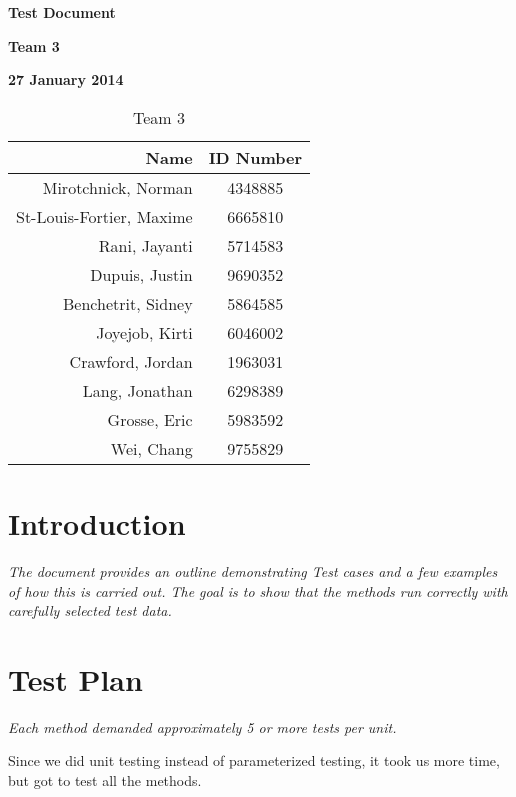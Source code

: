 \documentclass[12pt]{article}
\begin{document}
\vspace*{0.5in}
\centerline{\bf\Large Test Document}

\vspace*{0.5in}
\centerline{\bf\Large Team 3}

\vspace*{0.5in}
\centerline{\bf\Large 27 January 2014}

\vspace*{1.5in}
\begin{table}[htbp]
\caption{Team 3}
\begin{center}
\begin{tabular}{|r | c|}
\hline
Name & ID Number \\
\hline
Mirotchnick, Norman & 4348885 \\
\hline
St-Louis-Fortier, Maxime & 6665810\\
\hline
Rani, Jayanti & 5714583 \\
\hline
Dupuis, Justin & 9690352\\
\hline
Benchetrit, Sidney & 5864585 \\
\hline
Joyejob, Kirti & 6046002 \\
\hline
Crawford, Jordan & 1963031 \\
\hline
Lang, Jonathan & 6298389 \\
\hline
Grosse, Eric & 5983592 \\
\hline
Wei, Chang & 9755829 \\
\hline
\end{tabular}
\end{center}
\end{table}

\clearpage

\section{Introduction}

{\it
The document provides an outline demonstrating Test cases and a few examples of how this is carried out. 
The goal is to show that the methods run correctly with carefully selected test data.
}

\section{Test Plan}

{\it
Each method demanded approximately 5 or more tests per unit.

Since we did unit testing instead of parameterized testing, it took us more time, but got to test all the methods.

}
\end{document}
